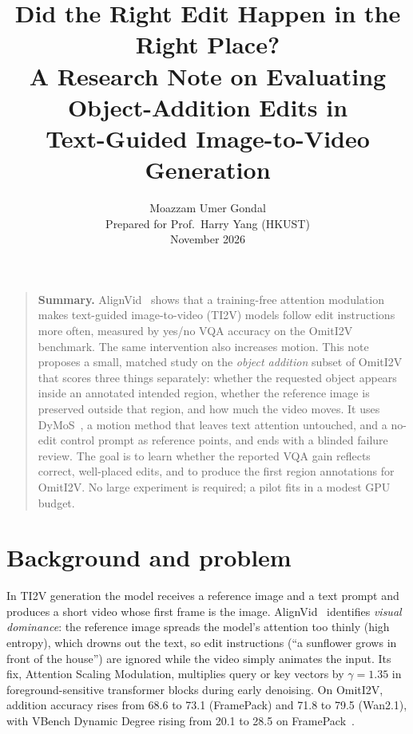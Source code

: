 \documentclass[10pt,a4paper]{article}
\title{\vspace{-1.6em}\large\bfseries
Did the Right Edit Happen in the Right Place?\\
A Research Note on Evaluating Object-Addition Edits in\\ Text-Guided Image-to-Video Generation}
\author{\normalsize Moazzam Umer Gondal \\
\small Prepared for Prof.\ Harry Yang (HKUST) \\
\small November 2026}
\date{}
\begin{document}
\maketitle
\vspace{-2.2em}

\begin{quote}\small
\textbf{Summary.} AlignVid~\cite{alignvid} shows that a training-free attention modulation makes text-guided image-to-video (TI2V) models follow edit instructions more often, measured by yes/no VQA accuracy on the OmitI2V benchmark. The same intervention also increases motion. This note proposes a small, matched study on the \emph{object addition} subset of OmitI2V that scores three things separately: whether the requested object appears inside an annotated intended region, whether the reference image is preserved outside that region, and how much the video moves. It uses DyMoS~\cite{dymos}, a motion method that leaves text attention untouched, and a no-edit control prompt as reference points, and ends with a blinded failure review. The goal is to learn whether the reported VQA gain reflects correct, well-placed edits, and to produce the first region annotations for OmitI2V. No large experiment is required; a pilot fits in a modest GPU budget.
\end{quote}

\section{Background and problem}

In TI2V generation the model receives a reference image and a text prompt and produces a short video whose first frame is the image. AlignVid~\cite{alignvid} identifies \emph{visual dominance}: the reference image spreads the model's attention too thinly (high entropy), which drowns out the text, so edit instructions (``a sunflower grows in front of the house'') are ignored while the video simply animates the input. Its fix, Attention Scaling Modulation, multiplies query or key vectors by $\gamma = 1.35$ in foreground-sensitive transformer blocks during early denoising. On OmitI2V, addition accuracy rises from 68.6 to 73.1 (FramePack) and 71.8 to 79.5 (Wan2.1), with VBench Dynamic Degree rising from 20.1 to 28.5 on FramePack~\cite{alignvid}.
\end{document}
